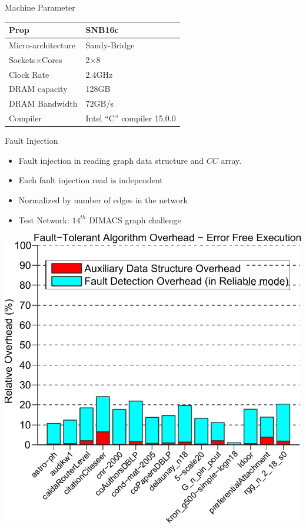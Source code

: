 
\begin{block}{Machine Parameter}
\begin{center}
\begin{tabular}{l|l}
\toprule
Prop                 & SNB16c       \\
\midrule
Micro-architecture    & Sandy-Bridge  \\
Sockets$\times$Cores & 2$\times$8   \\
Clock Rate           & 2.4GHz       \\
DRAM capacity        & 128GB        \\
DRAM Bandwidth       & 72GB/s      \\
Compiler       		 & Intel ``C'' compiler 15.0.0     \\
\bottomrule
\end{tabular}
\end{center}
\end{block}

\begin{block}{Fault Injection}
\begin{itemize}
\item Fault injection in reading graph data structure and $CC$ array.
\item Each fault injection read is independent
\item Normalized by number of edges in the network
\end{itemize}
\end{block}

\begin{itemize}
\item Test Network: $14^{th}$ DIMACS graph challenge
\end{itemize}
\lyxframeend{}


\centering
\includegraphics[height=.75\textheight]{plots/plot_zero_overhead-1}

